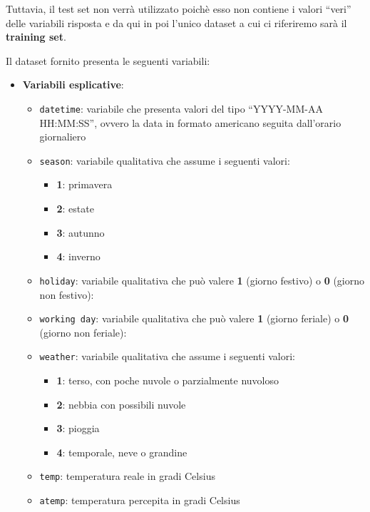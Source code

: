 Tuttavia, il test set non verrà utilizzato poichè esso non contiene i valori
``veri'' delle variabili risposta e da qui in poi l'unico dataset a cui ci
riferiremo sarà il \textbf{training set}.

Il dataset fornito presenta le seguenti variabili:

\begin{itemize}
\item \textbf{Variabili esplicative}:
  \begin{itemize}
  \item \texttt{datetime}: variabile che presenta valori del tipo ``YYYY-MM-AA
    HH:MM:SS'', ovvero la data in formato americano seguita dall'orario
    giornaliero

  \item \texttt{season}: variabile qualitativa che assume i seguenti valori:
    \begin{itemize}
    \item \textbf{1}: primavera
    \item \textbf{2}: estate
    \item \textbf{3}: autunno
    \item \textbf{4}: inverno
    \end{itemize}

  \item \texttt{holiday}: variabile qualitativa che può valere \textbf{1}
  (giorno festivo) o \textbf{0} (giorno non festivo):

  \item \texttt{working day}: variabile qualitativa che può valere \textbf{1}
  (giorno feriale) o \textbf{0} (giorno non feriale):

  \item \texttt{weather}: variabile qualitativa che assume i seguenti
    valori:
    \begin{itemize}
    \item \textbf{1}: terso, con poche nuvole o parzialmente nuvoloso
    \item \textbf{2}: nebbia con possibili nuvole
    \item \textbf{3}: pioggia
    \item \textbf{4}: temporale, neve o grandine
    \end{itemize}

  \item \texttt{temp}: temperatura reale in gradi Celsius

  \item \texttt{atemp}: temperatura percepita in gradi Celsius


\end{itemize}
\end{itemize}
